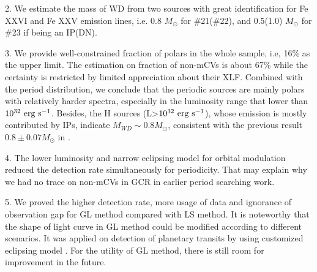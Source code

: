 \documentclass[twoside,twocolumn]{aastex63}
\begin{document}
2.  We estimate the mass of WD from two sources with great identification for Fe XXVI and Fe XXV emission lines, i.e. 0.8 $M_\odot$ for \#21(\#22), and 0.5(1.0) $M_\odot$ for \#23 if being an IP(DN). 

3. We provide well-constrained fraction of polars in the whole sample, i.e, 16\% as the upper limit. The estimation on fraction of non-mCVs is about 67\% while the certainty is restricted by limited appreciation about their XLF. Combined with the period distribution, we conclude that the periodic sources are mainly polars with relatively harder spectra, especially in the luminosity range that lower than $\rm 10^{32}~erg~s^{-1}$. Besides, the H sources (L>$\rm 10^{32}~erg~s^{-1}$), whose emission is mostly contributed by IPs, indicate  $M_{WD} \sim 0.8 M_\odot$, consistent with the previous result $0.8\pm 0.07 M_\odot$ in \citep{2018ApJ...853..182Y}.

4. The lower luminosity and narrow eclipsing model for orbital modulation reduced the detection rate simultaneously for periodicity. That may explain why we had no trace on non-mCVs in GCR in earlier period searching work.

5. We proved the higher detection rate, more usage of data and ignorance of observation gap for GL method compared with LS method. It is noteworthy that the shape of light curve in GL method could be modified according to different scenarios. It was applied on detection of planetary transits by using customized eclipsing model \citep{2002A&A...395..625A}. For the utility of GL method, there is still room for improvement in the future.
\end{document}
